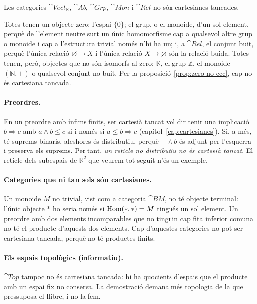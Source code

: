\begin{corollari}\label{cor:zero-no-ccc}
Les categories $\cat{Vect}_{\mathbb K}$, $\cat{Ab}$, $\cat{Grp}$, $\cat{Mon}$ i $\cat{Rel}$ no són cartesianes tancades.
\end{corollari}

\begin{prova}
Totes tenen un objecte zero: l'espai $\{0\}$; el grup, o el monoide, d'un sol element, perquè de l'element neutre surt un únic homomorfisme cap a qualsevol altre grup o monoide i cap a l'estructura trivial només n'hi ha un; i, a $\cat{Rel}$, el conjunt buit, perquè l'única relació $\varnothing\to X$ i l'única relació $X\to\varnothing$ són la relació buida. Totes tenen, però, objectes que no són isomorfs al zero: $\mathbb K$, el grup $\mathbb Z$, el monoide $(\mathbb N,+)$ o qualsevol conjunt no buit. Per la proposició~\ref{prop:zero-no-ccc}, cap no és cartesiana tancada.
\end{prova}

\paragraph{Preordres.} En un preordre amb ínfims finits, ser cartesià tancat vol dir tenir una implicació $b\Rightarrow c$ amb $a\wedge b\le c$ si i només si $a\le b\Rightarrow c$ (capítol~\ref{cap:cartesianes}). Si, a més, té suprems binaris, aleshores és distributiu, perquè $-\wedge b$ és adjunt per l'esquerra i preserva els suprems. Per tant, \emph{un reticle no distributiu no és cartesià tancat}. El reticle dels subespais de $\mathbb R^2$ que veurem tot seguit n'és un exemple.

\paragraph{Categories que ni tan sols són cartesianes.} Un monoide $M$ no trivial, vist com a categoria $\cat{B}M$, no té objecte terminal: l'únic objecte $\ast$ ho seria només si $\operatorname{Hom}(\ast,\ast)=M$ tingués un sol element. Un preordre amb dos elements incomparables que no tinguin cap fita inferior comuna no té el producte d'aquests dos elements. Cap d'aquestes categories no pot ser cartesiana tancada, perquè no té productes finits.

\paragraph{Els espais topològics (informatiu).} $\cat{Top}$ tampoc no és cartesiana tancada: hi ha quocients d'espais que el producte amb un espai fix no conserva. La demostració demana més topologia de la que pressuposa el llibre, i no la fem.

